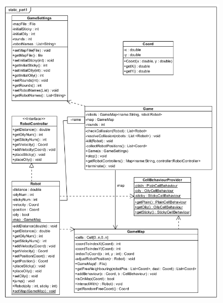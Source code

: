 \begin{figure}[!htbp]
	\begin{center}
		\includegraphics[width=180mm, center]{./chapters/chapter03/static1.png}
		\caption{}
	\end{center}
\end{figure}

